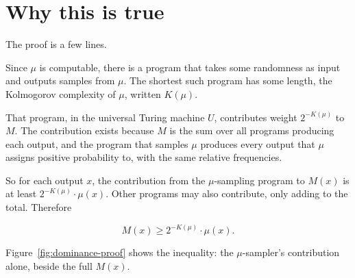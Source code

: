 \section*{Why this is true}

The proof is a few lines.

Since $\mu$ is computable, there is a program that takes some randomness as input and outputs samples from $\mu$. The shortest such program has some length, the Kolmogorov complexity of $\mu$, written $K(\mu)$.

That program, in the universal Turing machine $U$, contributes weight $2^{-K(\mu)}$ to $M$. The contribution exists because $M$ is the sum over all programs producing each output, and the program that samples $\mu$ produces every output that $\mu$ assigns positive probability to, with the same relative frequencies.

So for each output $x$, the contribution from the $\mu$-sampling program to $M(x)$ is at least $2^{-K(\mu)} \cdot \mu(x)$. Other programs may also contribute, only adding to the total. Therefore

$$M(x) \geq 2^{-K(\mu)} \cdot \mu(x).$$

Figure~\ref{fig:dominance-proof} shows the inequality: the $\mu$-sampler's contribution alone, beside the full $M(x)$.

